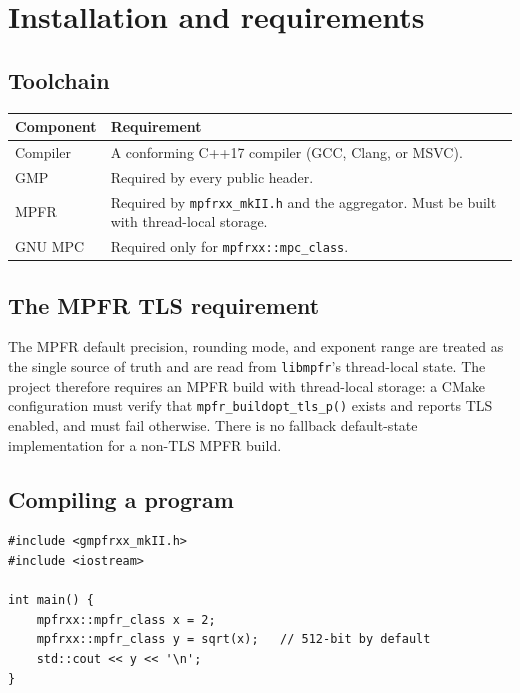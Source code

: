 \documentclass[11pt,a4paper]{article}
\newcommand{\code}[1]{\lstinline!#1!}
\begin{document}
\section{Installation and requirements}

\subsection{Toolchain}

\begin{longtable}{@{}p{}p{}@{}}
\toprule
\textbf{Component} & \textbf{Requirement} \\
\midrule
\endhead
Compiler & A conforming C++17 compiler (GCC, Clang, or MSVC). \\
GMP & Required by every public header. \\
MPFR & Required by \code{mpfrxx_mkII.h} and the aggregator. Must be built
with thread-local storage. \\
GNU MPC & Required only for \code{mpfrxx::mpc_class}. \\
\bottomrule
\end{longtable}

\subsection{The MPFR TLS requirement}

The MPFR default precision, rounding mode, and exponent range are treated as the
single source of truth and are read from \code{libmpfr}'s thread-local state. The
project therefore requires an MPFR build with thread-local storage: a CMake
configuration must verify that \code{mpfr_buildopt_tls_p()} exists and reports
TLS enabled, and must fail otherwise. There is no fallback default-state
implementation for a non-TLS MPFR build.

\subsection{Compiling a program}

\begin{lstlisting}
#include <gmpfrxx_mkII.h>
#include <iostream>

int main() {
    mpfrxx::mpfr_class x = 2;
    mpfrxx::mpfr_class y = sqrt(x);   // 512-bit by default
    std::cout << y << '\n';
}
\end{lstlisting}
\end{document}
